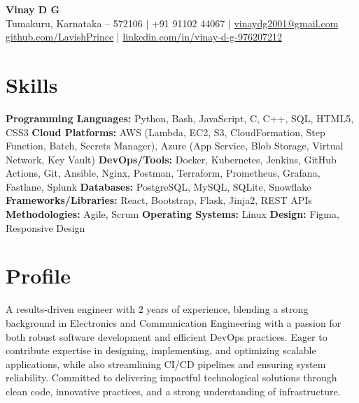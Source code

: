 \documentclass[a4paper,10pt]{article}
\begin{document}
\textbf{\Large Vinay D G} \\Tumakuru, Karnataka – 572106 \quad | \quad +91 91102 44067 \quad | \quad \href{mailto:vinaydg2001@gmail.com}{vinaydg2001@gmail.com} \\\href{https://github.com/LavishPrince}{github.com/LavishPrince} \quad | \quad \href{https://www.linkedin.com/in/vinay-d-g-976207212/}{linkedin.com/in/vinay-d-g-976207212}

\section*{Skills}
\textbf{Programming Languages:} Python, Bash, JavaScript, C, C++, SQL, HTML5, CSS3
\textbf{Cloud Platforms:} AWS (Lambda, EC2, S3, CloudFormation, Step Function, Batch, Secrets Manager), Azure (App Service, Blob Storage, Virtual Network, Key Vault)
\textbf{DevOps/Tools:} Docker, Kubernetes, Jenkins, GitHub Actions, Git, Ansible, Nginx, Postman, Terraform, Prometheus, Grafana, Fastlane, Splunk
\textbf{Databases:} PostgreSQL, MySQL, SQLite, Snowflake
\textbf{Frameworks/Libraries:} React, Bootstrap, Flask, Jinja2, REST APIs
\textbf{Methodologies:} Agile, Scrum
\textbf{Operating Systems:} Linux
\textbf{Design:} Figma, Responsive Design

\section*{Profile}
A results-driven engineer with 2 years of experience, blending a strong background in Electronics and Communication Engineering with a passion for both robust software development and efficient DevOps practices. Eager to contribute expertise in designing, implementing, and optimizing scalable applications, while also streamlining CI/CD pipelines and ensuring system reliability. Committed to delivering impactful technological solutions through clean code, innovative practices, and a strong understanding of infrastructure.

\end{document}
